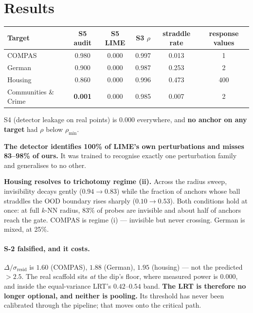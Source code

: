 \documentclass[11pt]{article}
\begin{document}
\section{Results}

\begin{table}[h]
\small\centering
\begin{tabular}{@{}lccccc@{}}
\toprule
\textbf{\sffamily Target} & \textbf{S5} audit & \textbf{S5} LIME & \textbf{S3} $\rho$
  & straddle rate & response values\\
\midrule
COMPAS & 0.980 & 0.000 & 0.997 & 0.013 & 1\\
German & 0.900 & 0.000 & 0.987 & 0.253 & 2\\
Housing & 0.860 & 0.000 & 0.996 & 0.473 & 400\\
Communities \& Crime & \textbf{0.001} & 0.000 & 0.985 & 0.007 & 2\\
\bottomrule
\end{tabular}
\end{table}

\noindent S4 (detector leakage on real points) is $0.000$ everywhere, and \textbf{no anchor on
any target} had $\rho$ below $\rho_{\min}$.

\begin{resultbox}
\noindent\textbf{The detector identifies 100\% of LIME's own perturbations and misses 83--98\% of
ours.} It was trained to recognise exactly one perturbation family and generalises to no other.

\smallskip
\noindent\textbf{Housing resolves to trichotomy regime (ii).} Across the radius sweep,
invisibility decays gently ($0.94 \to 0.83$) while the fraction of anchors whose ball straddles
the OOD boundary rises sharply ($0.10 \to 0.53$). Both conditions hold at once: at full $k$-NN
radius, 83\% of probes are invisible and about half of anchors reach the gate. COMPAS is regime
(i) --- invisible but never crossing. German is mixed, at 25\%.
\end{resultbox}

\paragraph{S-2 falsified, and it costs.} $\Delta/\sigma_{\text{resid}}$ is $1.60$ (COMPAS),
$1.88$ (German), $1.95$ (housing) --- not the predicted ${>}2.5$. The real scaffold sits
\emph{at} the dip's floor, where measured power is $0.000$, and inside the equal-variance LRT's
$0.42$--$0.54$ band. \textbf{The LRT is therefore no longer optional, and neither is pooling.}
Its threshold has never been calibrated through the pipeline; that moves onto the critical path.
\end{document}
